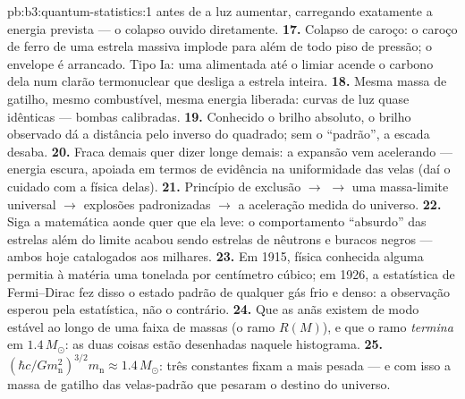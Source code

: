 \begin{solution}{pb:b3:quantum-statistics:1}
antes de a luz aumentar, carregando exatamente a energia prevista
--- o colapso ouvido diretamente.
\textbf{17.} Colapso de caroço: o caroço de ferro de uma estrela massiva
implode para além de todo piso de pressão; o envelope é arrancado. Tipo
Ia: uma  alimentada até o limiar acende o carbono dela num
clarão termonuclear que desliga a estrela inteira.
\textbf{18.} Mesma massa de gatilho, mesmo combustível, mesma energia
liberada: curvas de luz quase idênticas --- bombas calibradas.
\textbf{19.} Conhecido o brilho absoluto, o brilho observado
dá a distância pelo inverso do quadrado; sem o
``padrão'', a escada desaba.
\textbf{20.} Fraca demais quer dizer longe demais: a expansão vem
acelerando --- energia escura, apoiada em termos de evidência na
uniformidade das velas (daí o cuidado com a física delas).
\textbf{21.} Princípio de exclusão $\to$  $\to$ uma
massa-limite universal $\to$ explosões padronizadas $\to$ a
aceleração medida do universo.
\textbf{22.} Siga a matemática aonde quer que ela leve: o
comportamento ``absurdo'' das estrelas além do limite acabou sendo
estrelas de nêutrons e buracos negros --- ambos hoje catalogados aos
milhares.
\textbf{23.} Em 1915, física conhecida alguma permitia à matéria uma
tonelada por centímetro cúbico; em 1926, a estatística de Fermi--Dirac
fez disso o estado padrão de qualquer gás frio e denso: a observação
esperou pela estatística, não o contrário.
\textbf{24.} Que as anãs existem de modo estável ao longo de uma faixa
de massas (o ramo $R(M)$), e que o ramo \emph{termina} em
$1.4\,M_\odot$: as duas coisas estão desenhadas naquele histograma.
\textbf{25.} $(\hbar c/Gm_{\text{n}}^2)^{3/2}m_{\text{n}} \approx
1.4\,M_\odot$: três constantes fixam a  mais pesada ---
e com isso a massa de gatilho das velas-padrão que pesaram
o destino do universo.
\end{solution}
